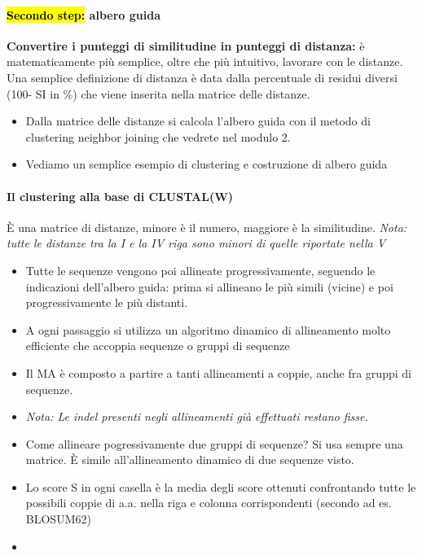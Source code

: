 \documentclass{article}
\begin{document}
\paragraph{\hl{Secondo step:} albero guida\\}
\textbf{Convertire i punteggi di similitudine in punteggi di distanza:} è matematicamente più semplice, oltre che più intuitivo, lavorare con le distanze. Una semplice definizione di distanza è data dalla percentuale di
residui diversi (100- SI in \%) che viene inserita nella matrice delle distanze.
\begin{itemize}
    \item Dalla matrice delle distanze si calcola l'albero guida con il metodo di clustering neighbor joining che vedrete nel modulo 2.
    \item Vediamo un semplice esempio di clustering e costruzione di albero guida
\end{itemize}
\paragraph{Il clustering alla base di CLUSTAL(W)} È una matrice di distanze, minore è il numero, maggiore è la similitudine.
\textit{Nota: tutte le distanze tra la I e la IV riga sono minori di quelle riportate nella V}
\begin{itemize}
    \item Tutte le sequenze vengono poi allineate progressivamente, seguendo le indicazioni dell'albero
    guida: prima si allineano le più simili (vicine) e poi progressivamente le più distanti.
    \item A ogni passaggio si utilizza un algoritmo dinamico di allineamento molto efficiente che accoppia sequenze o gruppi di sequenze
    \item Il MA è composto a partire a tanti allineamenti a coppie, anche fra gruppi di sequenze.
    \item{} \textit{Nota: Le indel presenti negli allineamenti già effettuati restano fisse.}
    \item Come allineare pogressivamente due gruppi di sequenze? Si usa sempre una matrice. È simile all'allineamento dinamico di due sequenze visto.
    \item Lo score S in ogni
    casella è la media degli score ottenuti confrontando tutte le possibili coppie di a.a. nella riga e colonna
    corrispondenti (secondo ad es. BLOSUM62)
    \item 
\end{itemize}
\end{document}
